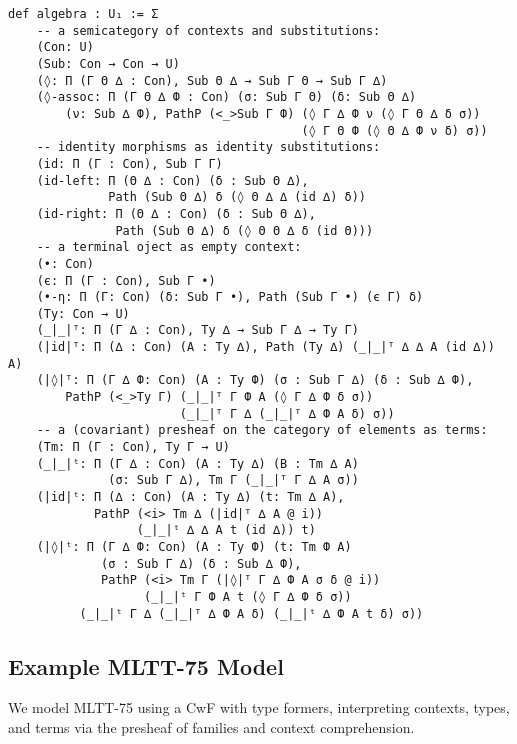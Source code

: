 \documentclass{article}
\begin{document}
\newpage
\begin{lstlisting}[mathescape=true]
def algebra : U₁ := Σ
    -- a semicategory of contexts and substitutions:
    (Con: U)
    (Sub: Con → Con → U)
    (◊: Π (Г Θ ∆ : Con), Sub Θ ∆ → Sub Г Θ → Sub Г ∆)
    (◊-assoc: Π (Г Θ ∆ Ф : Con) (σ: Sub Г Θ) (δ: Sub Θ ∆)
        (ν: Sub ∆ Ф), PathP (<_>Sub Г Ф) (◊ Г ∆ Ф ν (◊ Г Θ ∆ δ σ))
                                         (◊ Г Θ Ф (◊ Θ ∆ Ф ν δ) σ))
    -- identity morphisms as identity substitutions:
    (id: Π (Г : Con), Sub Г Г)
    (id-left: Π (Θ ∆ : Con) (δ : Sub Θ ∆),
              Path (Sub Θ ∆) δ (◊ Θ ∆ ∆ (id ∆) δ))
    (id-right: Π (Θ ∆ : Con) (δ : Sub Θ ∆),
               Path (Sub Θ ∆) δ (◊ Θ Θ ∆ δ (id Θ)))
    -- a terminal oject as empty context:
    (•: Con)
    (є: Π (Г : Con), Sub Г •)
    (•-η: Π (Г: Con) (δ: Sub Г •), Path (Sub Г •) (є Г) δ)
    (Ty: Con → U)
    (_|_|ᵀ: Π (Г ∆ : Con), Ty ∆ → Sub Г ∆ → Ty Г)
    (|id|ᵀ: Π (∆ : Con) (A : Ty ∆), Path (Ty ∆) (_|_|ᵀ ∆ ∆ A (id ∆)) A)
    (|◊|ᵀ: Π (Г ∆ Ф: Con) (A : Ty Ф) (σ : Sub Г ∆) (δ : Sub ∆ Ф),
        PathP (<_>Ty Г) (_|_|ᵀ Г Ф A (◊ Г ∆ Ф δ σ))
                        (_|_|ᵀ Г ∆ (_|_|ᵀ ∆ Ф A δ) σ))
    -- a (covariant) presheaf on the category of elements as terms:
    (Tm: Π (Г : Con), Ty Г → U)
    (_|_|ᵗ: Π (Г ∆ : Con) (A : Ty ∆) (B : Tm ∆ A)
              (σ: Sub Г ∆), Tm Г (_|_|ᵀ Г ∆ A σ))
    (|id|ᵗ: Π (∆ : Con) (A : Ty ∆) (t: Tm ∆ A),
            PathP (<i> Tm ∆ (|id|ᵀ ∆ A @ i))
                  (_|_|ᵗ ∆ ∆ A t (id ∆)) t)
    (|◊|ᵗ: Π (Г ∆ Ф: Con) (A : Ty Ф) (t: Tm Ф A)
             (σ : Sub Г ∆) (δ : Sub ∆ Ф),
             PathP (<i> Tm Г (|◊|ᵀ Г ∆ Ф A σ δ @ i))
                   (_|_|ᵗ Г Ф A t (◊ Г ∆ Ф δ σ))
          (_|_|ᵗ Г ∆ (_|_|ᵀ ∆ Ф A δ) (_|_|ᵗ ∆ Ф A t δ) σ))
\end{lstlisting}

\newpage
\subsection{Example MLTT-75 Model}

We model MLTT-75 using a CwF with type formers, interpreting contexts, types, and terms via the presheaf of families and context comprehension.
\end{document}
